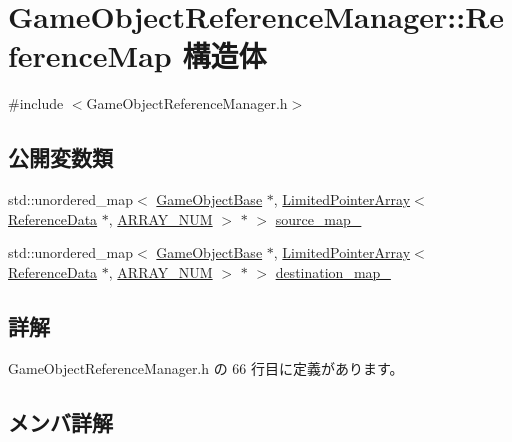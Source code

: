 \hypertarget{struct_game_object_reference_manager_1_1_reference_map}{}\section{Game\+Object\+Reference\+Manager\+:\+:Reference\+Map 構造体}
\label{struct_game_object_reference_manager_1_1_reference_map}


{\ttfamily \#include $<$Game\+Object\+Reference\+Manager.\+h$>$}

\subsection*{公開変数類}
\begin{DoxyCompactItemize}
\item 
std\+::unordered\+\_\+map$<$ \mbox{\hyperlink{class_game_object_base}{Game\+Object\+Base}} $\ast$, \mbox{\hyperlink{class_limited_pointer_array}{Limited\+Pointer\+Array}}$<$ \mbox{\hyperlink{struct_game_object_reference_manager_1_1_reference_data}{Reference\+Data}} $\ast$, \mbox{\hyperlink{class_game_object_reference_manager_a962d30b10c5b76353645773b2c1740ce}{A\+R\+R\+A\+Y\+\_\+\+N\+UM}} $>$ $\ast$ $>$ \mbox{\hyperlink{struct_game_object_reference_manager_1_1_reference_map_a971b47dd8f37ba3739ce65a6dfe097ff}{source\+\_\+map\+\_\+}}
\item 
std\+::unordered\+\_\+map$<$ \mbox{\hyperlink{class_game_object_base}{Game\+Object\+Base}} $\ast$, \mbox{\hyperlink{class_limited_pointer_array}{Limited\+Pointer\+Array}}$<$ \mbox{\hyperlink{struct_game_object_reference_manager_1_1_reference_data}{Reference\+Data}} $\ast$, \mbox{\hyperlink{class_game_object_reference_manager_a962d30b10c5b76353645773b2c1740ce}{A\+R\+R\+A\+Y\+\_\+\+N\+UM}} $>$ $\ast$ $>$ \mbox{\hyperlink{struct_game_object_reference_manager_1_1_reference_map_adbf8d8d6d3ed18dcceb2ae04b8794351}{destination\+\_\+map\+\_\+}}
\end{DoxyCompactItemize}


\subsection{詳解}


 Game\+Object\+Reference\+Manager.\+h の 66 行目に定義があります。



\subsection{メンバ詳解}
\mbox{\label{struct_game_object_reference_manager_1_1_reference_map_adbf8d8d6d3ed18dcceb2ae04b8794351}} 
